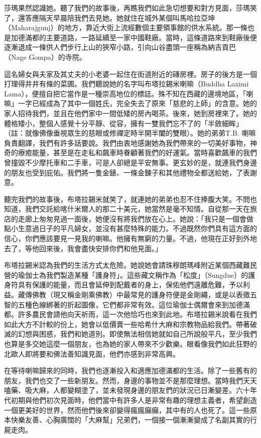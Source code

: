 莎瑪果然認識她。聽了我們的故事後，再瞧我們如此急切想要和對方見面，莎瑪笑了，還答應隔天早晨陪我們去見她。她就住在城外某個叫馬哈拉亞坤（Maharajgunj）的地方，靠近大街上流經數個主要領事館的供水系統。那一條也是加德滿都的主要道路，一路延續至一家中國鞋廠。當時，這條道路來到鞋廠後便逐漸退成一條供人們步行上山的狹窄小路，引向山谷盡頭一座稱為納吉貢巴（Nage
Gompa）的寺院。

這名婦女與夫家及其丈夫的小老婆一起住在街道附近的磚房裡。房子的後方是一個打理得井井有條的菜圃。我們聽說她的名字叫布塔拉錫米喇嘛（Buddha
Laximi
Lama），便擅自把它當作是一種崇高地位的標誌。殊不知在西藏的邊境地區，「喇嘛」一字已經成為了其中一個姓氏，完全失去了原來「慈悲的上師」的含意。她的家人招待我們，並且在他們家中一間低矮的房內喝茶。後來，她到房裡來了。她的體格矮小，整個人感覺十分平靜、從容，擁有一雙我們忘不了的「半斂細眸」（註：就像佛像垂視眾生的慈眼或修禪定時半開半闔的雙眼）。她的弟弟T.B.
喇嘛負責翻譯，我們有許多話要說。我們由衷地感謝她為我們帶來的一切美好事物，神奇的療癒能量，甚至是在走私和飆車時眷顧著我們的好運氣。當時喜歡飆車的我們曾撞毀不少摩托車和二手車，可是人卻總是平安無事。更玄妙的是，就連我們身邊的朋友也受到庇佑。我們將一隻金錶、一條金鍊子和其他禮物全都送給她，了表謝意。

聽完我們的故事後，布塔拉錫米就笑了，就連她的弟弟也忍不住捧腹大笑。不問也知道，我們交託給喀什米爾人的那二十美元，她當然是毫不知情。自從那一天在旅店的走廊上匆匆見過一面後，她便沒有將我們放在心上。她說：「我只是一個會做點小生意過日子的平凡婦女，並沒有甚麼特殊的能力。不過既然你們具有這方面的信心，你們應該要見一見我的喇嘛。他擁有無窮的力量。不過，他現在正好到外地去了，等他回來後，我會盡快安排你們和他見面。」

布塔拉錫米認為我們的生活方式太危險。她說她會請珠穆朗瑪峰附近某個西藏難民營的瑜伽士為我們製造某種「護身符」。這些藏文稱作為「松度」（Sungdue）的護身符具有保護的能量，而且會延伸到配戴者的身上，保佑他們遠離危難，予以利益。藏傳佛教（現又稱金剛乘佛教）中最常見的護身符便是金剛繩，或是以表徵五智的五種色線綁著的折起圖像，它們都非常有效。這位瑜伽士偶爾會來到加德滿都。許多農民會請他向天祈雨，這一次他恰巧也來到此地。布塔拉錫米說看在我們如此大方不計較的份上，她會以低價賣一些哈希什大麻和宗教物品給我們。帶著破滅的幻想與困惑，我們和她道別。即使無法相信她就如自己所說般平凡，至少我們也算是多交她這麼一個朋友，也為她的家人帶來不少歡樂。眼看像我們如此狂野的北歐人即將要和佛法善知識見面，他們亦感到非常高興。

在等待喇嘛歸來的同時，我們也逐漸投入和適應加德滿都的生活。除了一些舊有的朋友，我們也交了一些新朋友。然而，身邊的事物並不是那麼理想。當時我們天天嗑藥、吸大麻，人都變糊塗了，並未發現身邊的朋友們的狀況已日漸變差。六十年代初期與他們初次見面時，他們當中有許多人是非常有趣的理想主義者，希望創造一個更美好的世界，然而他們後來卻變得瘋瘋癲癲，其中有的人也死了。這一些原本快樂友善、心胸廣闊的「大麻幫」兄弟們，一個接一個漸漸變成了名副其實的行屍走肉。

